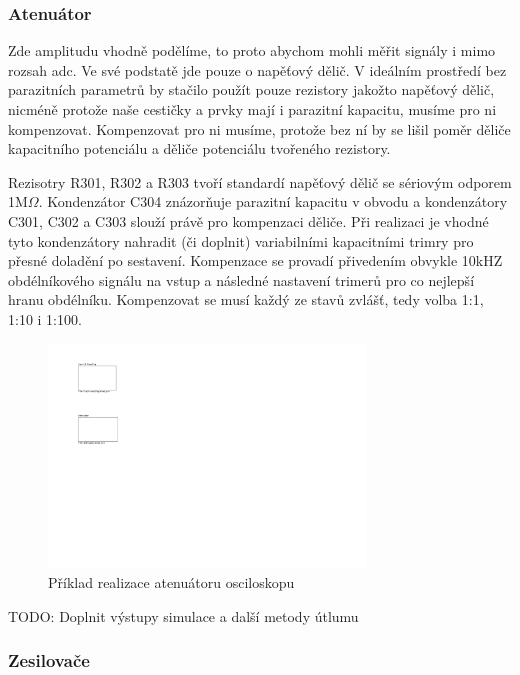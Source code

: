 \documentclass[12pt]{article}
\begin{document}
\subsubsection{Atenuátor}

Zde amplitudu vhodně podělíme, to proto abychom mohli měřit signály i mimo rozsah \acrshort{adc}.
Ve své podstatě jde pouze o napěťový dělič. V ideálním prostředí bez parazitních parametrů by
stačilo použít pouze rezistory jakožto napěťový dělič, nicméně protože naše cestičky a prvky
mají i parazitní kapacitu, musíme pro ni kompenzovat. Kompenzovat pro ni musíme, protože bez ní
by se lišil poměr děliče kapacitního potenciálu a děliče potenciálu tvořeného rezistory.
\cite{AnswerCompensatedAttenuator2016}

Rezisotry R301, R302 a R303 tvoří standardí napěťový dělič se sériovým odporem 1M$\Omega$. Kondenzátor C304
znázorňuje parazitní kapacitu v obvodu a kondenzátory C301, C302 a C303 slouží právě pro kompenzaci děliče.
Při realizaci je vhodné tyto kondenzátory nahradit (či doplnit) variabilními kapacitními trimry pro
přesné doladění po sestavení. Kompenzace se provadí přivedením obvykle 10kHZ obdélníkového signálu
na vstup a následné nastavení trimerů pro co nejlepší hranu obdélníku. Kompenzovat se musí každý ze
stavů zvlášť, tedy volba 1:1, 1:10 i 1:100.

\begin{figure}[h]
    \centering
    \includegraphics[width=0.75\textwidth, page=3]{kicad-export}
    \caption{Příklad realizace atenuátoru osciloskopu}
    \label{fig:attenuator-example}
\end{figure}

TODO: Doplnit výstupy simulace a další metody útlumu

\subsubsection{Zesilovače}
\end{document}
